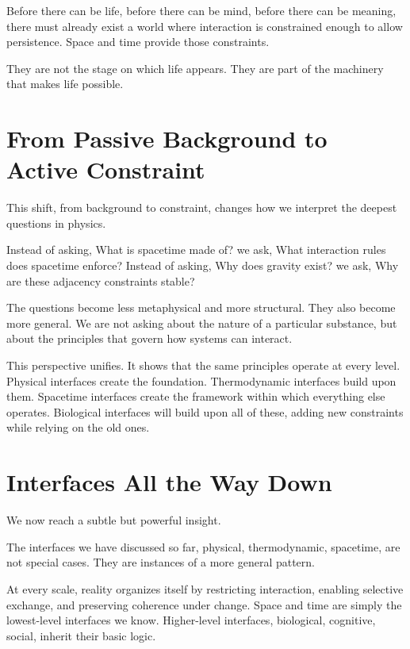 \documentclass[
  openright]{book}
\begin{document}
Before there can be life, before there can be mind, before there can be
meaning, there must already exist a world where interaction is
constrained enough to allow persistence. Space and time provide those
constraints.

They are not the stage on which life appears. They are part of the
machinery that makes life possible.

\section{From Passive Background to Active
Constraint}\label{from-passive-background-to-active-constraint}

This shift, from background to constraint, changes how we interpret the
deepest questions in physics.

Instead of asking, What is spacetime made of? we ask, What interaction
rules does spacetime enforce? Instead of asking, Why does gravity exist?
we ask, Why are these adjacency constraints stable?

The questions become less metaphysical and more structural. They also
become more general. We are not asking about the nature of a particular
substance, but about the principles that govern how systems can
interact.

This perspective unifies. It shows that the same principles operate at
every level. Physical interfaces create the foundation. Thermodynamic
interfaces build upon them. Spacetime interfaces create the framework
within which everything else operates. Biological interfaces will build
upon all of these, adding new constraints while relying on the old ones.

\section{Interfaces All the Way Down}\label{interfaces-all-the-way-down}

We now reach a subtle but powerful insight.

The interfaces we have discussed so far, physical, thermodynamic,
spacetime, are not special cases. They are instances of a more general
pattern.

At every scale, reality organizes itself by restricting interaction,
enabling selective exchange, and preserving coherence under change.
Space and time are simply the lowest-level interfaces we know.
Higher-level interfaces, biological, cognitive, social, inherit their
basic logic.
\end{document}
